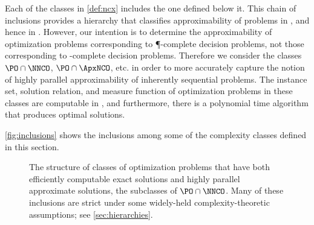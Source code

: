 \documentclass[]{article}
\begin{document}
Each of the classes in \autoref{def:ncx} includes the one defined below it.
This chain of inclusions provides a hierarchy that classifies approximability of problems in \NNCO{}, and hence in \NPO.
However, our intention is to determine the approximability of optimization problems corresponding to \P-complete decision problems, not those corresponding to \NP-complete decision problems.
Therefore we consider the classes $\PO \cap \NNCO$, $\PO \cap \ApxNCO$, etc. in order to more accurately capture the notion of highly parallel approximability of inherently sequential problems.
The instance set, solution relation, and measure function of optimization problems in these classes are computable in \NC{}, and furthermore, there is a polynomial time algorithm that produces optimal solutions.

\autoref{fig:inclusions} shows the inclusions among some of the complexity classes defined in this section.
\begin{figure}
  \caption{%
    The structure of classes of optimization problems that have both efficiently computable exact solutions and highly parallel approximate solutions, the subclasses of $\PO \cap \NNCO$.
    Many of these inclusions are strict under some widely-held complexity-theoretic assumptions; see \autoref{sec:hierarchies}.
    \label{fig:inclusions}}
  \begin{center}
  \end{center}
\end{figure}
\end{document}
